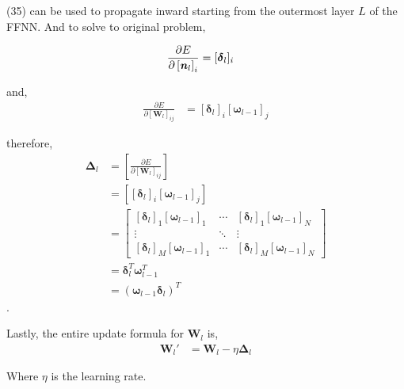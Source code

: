 \documentclass[12pt,letterpaper]{article}
\begin{document}
(35) can be used to propagate inward starting from the outermost layer $L$ of the FFNN.  And to solve to original problem, 

\begin{align}
\frac{\partial E}{ \partial \left[ \textbf{\textit{n}}_l \right]_i }
&= 
[\boldsymbol{\delta}_l]_i
\end{align}

and,
\begin{align}
\frac{\partial E}{\partial [\boldsymbol{W}_l]_{ij}}
&=
[\boldsymbol{\delta}_l]_i
[\boldsymbol{\omega}_{l-1}]_j
\end{align}

therefore,
\begin{align}
\boldsymbol{\Delta}_l 
&= 
\left[ \frac{\partial E}{\partial [\boldsymbol{W}_{l}]_{ij}} \right] \\
&=
\left[  
[\boldsymbol{\delta}_l]_i
[\boldsymbol{\omega}_{l-1}]_j
\right] \\
&= 
\begin{bmatrix}
[\boldsymbol{\delta}_l]_1 [\boldsymbol{\omega}_{l-1}]_1 & \cdots & [\boldsymbol{\delta}_l]_1 [\boldsymbol{\omega}_{l-1}]_N \\ 
\vdots &  \ddots & \vdots\\ 
[\boldsymbol{\delta}_l]_M [\boldsymbol{\omega}_{l-1}]_1  & \cdots & [\boldsymbol{\delta}_l]_M [\boldsymbol{\omega}_{l-1}]_N
\end{bmatrix} \\
&=
\boldsymbol{\delta}_l^T
\boldsymbol{\omega}_{l-1}^T \\
&=
(\boldsymbol{\omega}_{l-1}
\boldsymbol{\delta}_l)^T
\end{align}
.

Lastly, the entire update formula for $\boldsymbol{W}_l$ is,
\begin{align}
\boldsymbol{W}_l'
&=
\boldsymbol{W}_l - \eta \boldsymbol{\Delta}_l
\end{align}

Where $\eta$ is the learning rate.
\end{document}
